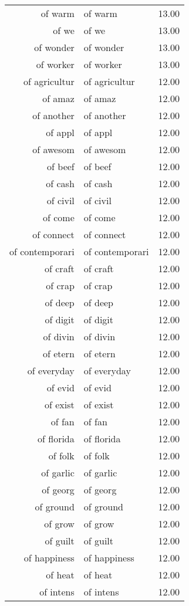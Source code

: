 \begin{table}[ht]
\begin{tabular}{rlr}
  of warm & of warm & 13.00 \\ 
  of we & of we & 13.00 \\ 
  of wonder & of wonder & 13.00 \\ 
  of worker & of worker & 13.00 \\ 
  of agricultur & of agricultur & 12.00 \\ 
  of amaz & of amaz & 12.00 \\ 
  of another & of another & 12.00 \\ 
  of appl & of appl & 12.00 \\ 
  of awesom & of awesom & 12.00 \\ 
  of beef & of beef & 12.00 \\ 
  of cash & of cash & 12.00 \\ 
  of civil & of civil & 12.00 \\ 
  of come & of come & 12.00 \\ 
  of connect & of connect & 12.00 \\ 
  of contemporari & of contemporari & 12.00 \\ 
  of craft & of craft & 12.00 \\ 
  of crap & of crap & 12.00 \\ 
  of deep & of deep & 12.00 \\ 
  of digit & of digit & 12.00 \\ 
  of divin & of divin & 12.00 \\ 
  of etern & of etern & 12.00 \\ 
  of everyday & of everyday & 12.00 \\ 
  of evid & of evid & 12.00 \\ 
  of exist & of exist & 12.00 \\ 
  of fan & of fan & 12.00 \\ 
  of florida & of florida & 12.00 \\ 
  of folk & of folk & 12.00 \\ 
  of garlic & of garlic & 12.00 \\ 
  of georg & of georg & 12.00 \\ 
  of ground & of ground & 12.00 \\ 
  of grow & of grow & 12.00 \\ 
  of guilt & of guilt & 12.00 \\ 
  of happiness & of happiness & 12.00 \\ 
  of heat & of heat & 12.00 \\ 
  of intens & of intens & 12.00 \\ 

\end{tabular}
\end{table}
